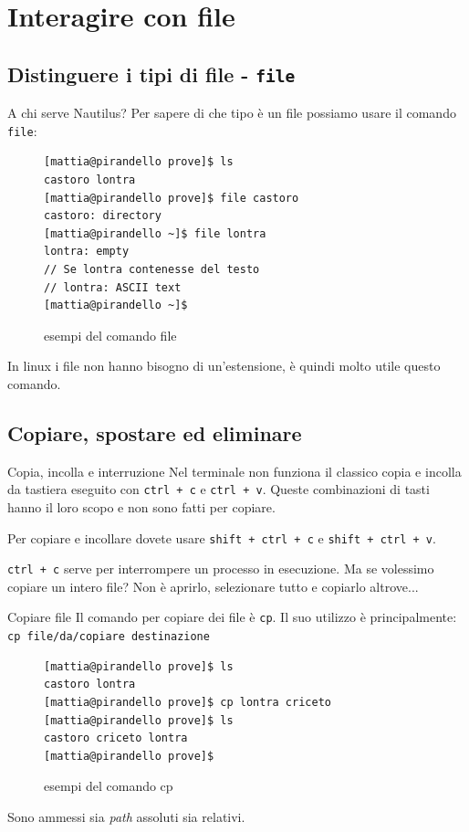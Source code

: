 \section{Interagire con file}

  \subsection{Distinguere i tipi di file - \texttt{file}}
\begin{frame}[fragile]{A chi serve Nautilus?}
  Per sapere di che tipo è un file possiamo usare il comando \texttt{file}:
  \begin{figure}
    \begin{lstlisting}[basicstyle=\footnotesize]
[mattia@pirandello prove]$ ls 
castoro lontra
[mattia@pirandello prove]$ file castoro 
castoro: directory
[mattia@pirandello ~]$ file lontra
lontra: empty
// Se lontra contenesse del testo
// lontra: ASCII text
[mattia@pirandello ~]$
    \end{lstlisting}
    \caption{esempi del comando file}
  \end{figure}
  In linux i file non hanno bisogno di un'estensione, è quindi molto utile 
  questo comando.
\end{frame}

\subsection{Copiare, spostare ed eliminare}
\begin{frame}{Copia, incolla e interruzione}
  Nel terminale non funziona il classico copia e incolla da tastiera eseguito
  con \texttt{ctrl + c} e \texttt{ctrl + v}. Queste combinazioni di tasti hanno 
  il loro scopo e non sono fatti per copiare.\bigskip

  Per copiare e incollare dovete usare \texttt{shift + ctrl + c} e 
  \texttt{shift + ctrl + v}.\bigskip

  \texttt{ctrl + c} serve per interrompere un processo in esecuzione.
  Ma se volessimo copiare un intero file? Non è aprirlo, selezionare tutto e copiarlo altrove...
\end{frame}

\begin{frame}[fragile]{Copiare file}
  Il comando per copiare dei file è \texttt{cp}. Il suo utilizzo è 
  principalmente: \texttt{cp file/da/copiare destinazione}
  \begin{figure}
    \begin{lstlisting}[basicstyle=\small]
[mattia@pirandello prove]$ ls 
castoro lontra
[mattia@pirandello prove]$ cp lontra criceto 
[mattia@pirandello prove]$ ls 
castoro criceto lontra
[mattia@pirandello prove]$
    \end{lstlisting}
    \caption{esempi del comando cp}
  \end{figure}
  Sono ammessi sia \textit{path} assoluti sia relativi.
\end{frame}

